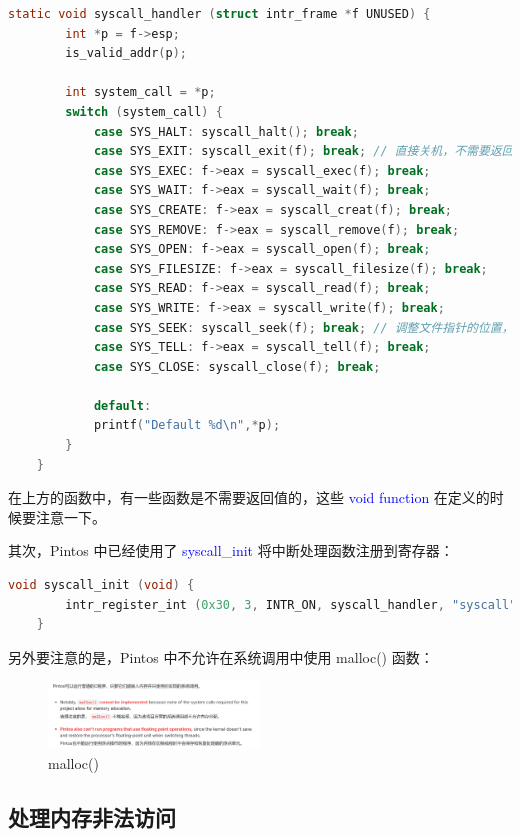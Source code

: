 \documentclass[14pt,a4paper,UTF8,twoside]{article}
\renewcommand{\texttt}[1]{\textcolor{blue}{\ttfamily #1}}
\begin{document}
\begin{lstlisting}[language=C, title= syscall.c]
    static void syscall_handler (struct intr_frame *f UNUSED) {
        int *p = f->esp;
        is_valid_addr(p);
    
        int system_call = *p;
        switch (system_call) {
            case SYS_HALT: syscall_halt(); break;
            case SYS_EXIT: syscall_exit(f); break; // 直接关机，不需要返回值，故是 void function
            case SYS_EXEC: f->eax = syscall_exec(f); break;
            case SYS_WAIT: f->eax = syscall_wait(f); break;
            case SYS_CREATE: f->eax = syscall_creat(f); break;
            case SYS_REMOVE: f->eax = syscall_remove(f); break;
            case SYS_OPEN: f->eax = syscall_open(f); break;
            case SYS_FILESIZE: f->eax = syscall_filesize(f); break;
            case SYS_READ: f->eax = syscall_read(f); break;
            case SYS_WRITE: f->eax = syscall_write(f); break;
            case SYS_SEEK: syscall_seek(f); break; // 调整文件指针的位置，也不需要返回值
            case SYS_TELL: f->eax = syscall_tell(f); break;
            case SYS_CLOSE: syscall_close(f); break;
    
            default:
            printf("Default %d\n",*p);
        }
    }
\end{lstlisting}

在上方的函数中，有一些函数是不需要返回值的，这些 \texttt{void function} 在定义的时候要注意一下。

其次，Pintos 中已经使用了 \texttt{syscall\_init} 将中断处理函数注册到寄存器：

\begin{lstlisting}[language=C, title= init.c]
    void syscall_init (void) {
        intr_register_int (0x30, 3, INTR_ON, syscall_handler, "syscall");
    }
\end{lstlisting}

另外要注意的是，Pintos 中不允许在系统调用中使用 malloc() 函数：

\begin{figure}[H]
    \centering
    \includegraphics[width=0.5\textwidth]{img5/warning.png}
    \caption{malloc()}
    \label{fig:malloc}
    \end{figure}
\subsection{处理内存非法访问}
\end{document}
